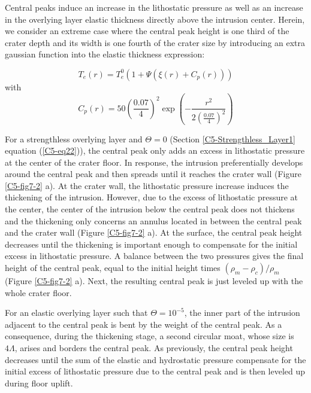 Central peaks induce  an increase in the lithostatic  pressure as well
as an increase in the overlying layer elastic thickness directly above
the intrusion  center. Herein, we  consider an extreme case  where the
central peak height is one third of  the crater depth and its width is
one  fourth  of the  crater  size  by  introducing an  extra  gaussian
function into the elastic thickness expression:

\begin{equation}
  T_e(r)=T_e^0(1+\Psi(\xi(r)+C_p(r)))
\end{equation}
with
\begin{equation}
  C_p(r)=50 \left(\frac{0.07}{4}\right)^2\exp\left(-\frac{r^2}{2(\frac{0.07}{4})^2}\right)
\end{equation}

For   a  strengthless   overlying   layer   and  $\Theta=0$   (Section
\ref{C5-Strengthless_Layer1}  equation  (\ref{C5-eq22})), the  central
peak only adds an excess in  lithostatic pressure at the center of the
crater  floor.  In  response, the  intrusion  preferentially  develops
around the central  peak and then spreads until it  reaches the crater
wall (Figure \ref{C5-fig7-2}  a). At the crater  wall, the lithostatic
pressure increase  induces the  thickening of the  intrusion. However,
due to the excess of lithostatic pressure at the center, the center of
the  intrusion  below the  central  peak  does  not thickens  and  the
thickening only  concerns an  annulus located  in between  the central
peak and the  crater wall (Figure \ref{C5-fig7-2} a).  At the surface,
the central  peak height decreases  until the thickening  is important
enough to compensate for the initial excess in lithostatic pressure. A
balance  between the  two  pressures  gives the  final  height of  the
central    peak,     equal    to    the    initial     height    times
$(\rho_m-\rho_c)/\rho_m$   (Figure  \ref{C5-fig7-2}   a).  Next,   the
resulting central peak is just leveled up with the whole crater floor.

For an elastic  overlying layer such that  $\Theta=10^{-5}$, the inner
part of  the intrusion  adjacent to  the central peak  is bent  by the
weight of  the central peak.  As a consequence, during  the thickening
stage, a  second circular moat,  whose size is $4\Lambda$,  arises and
borders  the central  peak.  As previously,  the  central peak  height
decreases  until  the sum  of  the  elastic and  hydrostatic  pressure
compensate for the  initial excess of lithostatic pressure  due to the
central peak and is then leveled up during floor uplift.

